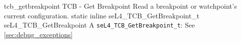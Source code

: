 %
%
%
%

\apidoc
{tcb_getbreakpoint}
{TCB - Get Breakpoint}
{Read a breakpoint or watchpoint's current configuration.}
{static inline seL4\_TCB\_GetBreakpoint\_t seL4\_TCB\_GetBreakpoint}
{
}
{A \texttt{seL4\_TCB\_GetBreakpoint\_t}: \tcbgetbreakpointtdesc}
{See \autoref{sec:debug_exceptions}}

